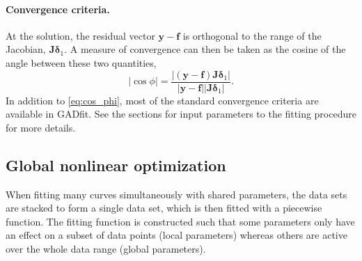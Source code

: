 \documentclass{article}
\begin{document}
\paragraph{Convergence criteria.} At the solution, the residual vector $\bm y - \bm f$ is orthogonal to the range of the Jacobian, $\bm J\bm\delta_1$. A measure of convergence can then be taken as the cosine of the angle between these two quantities,
\begin{equation}
  \label{eq:cos_phi}
  |\cos\phi| = \frac{|(\bm y - \bm f) \bm J\bm \delta_1|}{|\bm y - \bm
    f||\bm J\bm \delta_1|}.
\end{equation}
In addition to \eqref{eq:cos_phi}, most of the standard convergence criteria are available in GADfit. See the sections for input parameters to the fitting procedure for more details.

\subsection{Global nonlinear optimization}

When fitting many curves simultaneously with shared parameters, the data sets are stacked to form a single data set, which is then fitted with a piecewise function. The fitting function is constructed such that some parameters only have an effect on a subset of data points (local parameters) whereas others are active over the whole data range (global parameters).
\end{document}
